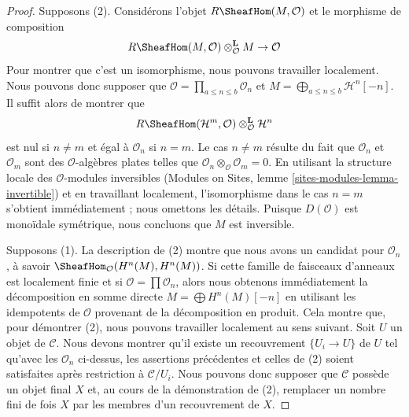 \begin{proof}
Supposons (2). Considérons l'objet $R\SheafHom(M, \mathcal{O})$ et le
morphisme de composition
$$
R\SheafHom(M, \mathcal{O}) \otimes_\mathcal{O}^\mathbf{L} M \to \mathcal{O}
$$
Pour montrer que c'est un isomorphisme, nous pouvons travailler localement.
Nous pouvons donc supposer que
$\mathcal{O} = \prod_{a \leq n \leq b} \mathcal{O}_n$ et
$M = \bigoplus_{a \leq n \leq b} \mathcal{H}^n[-n]$. Il suffit alors de
montrer que
$$
R\SheafHom(\mathcal{H}^m, \mathcal{O})
\otimes_\mathcal{O}^\mathbf{L} \mathcal{H}^n
$$
est nul si $n \not = m$ et égal à $\mathcal{O}_n$ si $n = m$. Le cas
$n \not = m$ résulte du fait que $\mathcal{O}_n$ et $\mathcal{O}_m$ sont des
$\mathcal{O}$-algèbres plates telles que
$\mathcal{O}_n \otimes_\mathcal{O} \mathcal{O}_m = 0$. En utilisant la
structure locale des $\mathcal{O}$-modules inversibles (Modules on Sites,
lemme \ref{sites-modules-lemma-invertible}) et en travaillant localement,
l'isomorphisme dans le cas $n = m$ s'obtient immédiatement ; nous omettons
les détails. Puisque $D(\mathcal{O})$ est monoïdale symétrique, nous concluons
que $M$ est inversible.

\medskip\noindent
Supposons (1). La description de (2) montre que nous avons un candidat pour
$\mathcal{O}_n$, à savoir
$\SheafHom_\mathcal{O}(H^n(M), H^n(M))$. Si cette famille de faisceaux
d'anneaux est localement finie et si
$\mathcal{O} = \prod \mathcal{O}_n$, alors nous obtenons immédiatement la
décomposition en somme directe $M = \bigoplus H^n(M)[-n]$ en utilisant les
idempotents de $\mathcal{O}$ provenant de la décomposition en produit. Cela
montre que, pour démontrer (2), nous pouvons travailler localement au sens
suivant. Soit $U$ un objet de $\mathcal{C}$. Nous devons montrer qu'il existe
un recouvrement $\{U_i \to U\}$ de $U$ tel qu'avec les $\mathcal{O}_n$
ci-dessus, les assertions précédentes et celles de (2) soient satisfaites
après restriction à $\mathcal{C}/U_i$. Nous pouvons donc supposer que
$\mathcal{C}$ possède un objet final $X$ et, au cours de la démonstration de
(2), remplacer un nombre fini de fois $X$ par les membres d'un recouvrement
de $X$.


\end{proof}
